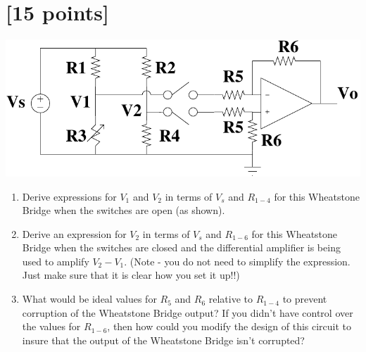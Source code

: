 

\section{[15 points]}

\begin{center}
\includegraphics[width=0.65\linewidth]{wheatstone_diff_amp}
\end{center}
 
\begin{enumerate}
    \item Derive expressions for $V_1$ and $V_2$ in terms of $V_s$ and $R_{1-4}$ for this Wheatstone Bridge when the switches are open (as shown).
    \item Derive an expression for $V_2$ in terms of $V_s$ and $R_{1-6}$ for this Wheatstone Bridge when the switches are closed and the differential amplifier is being used to amplify $V_2 - V_1$.  (Note - you do not need to simplify the expression.  Just make sure that it is clear how you set it up!!)
    \item What would be ideal values for $R_5$ and $R_6$ relative to $R_{1-4}$ to prevent corruption of the Wheatstone Bridge output?  If you didn't have control over the values for $R_{1-6}$, then how could you modify the design of this circuit to insure that the output of the Wheatstone Bridge isn't corrupted?
\end{enumerate}

\clearpage



\clearpage

